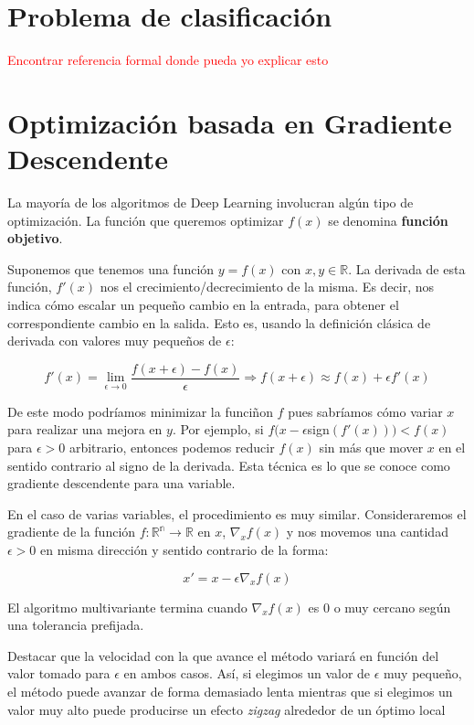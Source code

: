 	
	\section{Problema de clasificación}
	
	\textcolor{red}{Encontrar referencia formal donde pueda yo explicar esto}
	
	\section{Optimización basada en Gradiente Descendente}
	
	La mayoría de los algoritmos de Deep Learning involucran algún tipo de optimización. La función que queremos optimizar $f(x)$ se denomina \textbf{función objetivo}. 
	
	Suponemos que tenemos una función $y = f(x)$ con $x,y \in \mathbb{R}$. La derivada de esta función, $f'(x)$ nos el crecimiento/decrecimiento de la misma. Es decir, nos indica cómo escalar un pequeño cambio en la entrada, para obtener el correspondiente cambio en la salida. Esto es, usando la definición clásica de derivada con valores muy pequeños de $\epsilon$:
	
	$$
		f'(x) = \lim_{\epsilon \rightarrow 0} \frac{f(x+ \epsilon) - f(x)}{\epsilon} \Rightarrow f(x+ \epsilon) \approx f(x) + \epsilon f'(x)
	$$
	
	De este modo podríamos minimizar la funciñon $f$ pues sabríamos cómo variar $x$ para realizar una mejora en $y$. Por ejemplo, si $f(x - \epsilon$sign$(f'(x))) < f(x)$ para $\epsilon > 0$ arbitrario, entonces podemos reducir $f(x)$ sin más que mover $x$  en el sentido contrario al signo de la derivada. Esta técnica es lo que se conoce como gradiente descendente para una variable. 
	
	En el caso de varias variables, el procedimiento es muy similar. Consideraremos el gradiente de la función $f: \mathbb{R^n} \rightarrow \mathbb{R}$ en $x$, $\nabla_x f(x)$ y nos movemos una cantidad $\epsilon > 0$ en misma dirección y sentido contrario de la forma:
	
	$$
		x' = x - \epsilon \nabla_x f(x)	
	$$ 

	El algoritmo multivariante termina cuando $\nabla_x f(x)$ es 0 o muy cercano según una tolerancia prefijada.
	
	Destacar que la velocidad con la que avance el método variará en función del valor tomado para $\epsilon$ en ambos casos. Así, si elegimos un valor de $\epsilon$ muy pequeño, el método puede avanzar de forma demasiado lenta mientras que si elegimos un valor muy alto puede producirse un efecto \textit{zigzag} alrededor de un óptimo local
	
